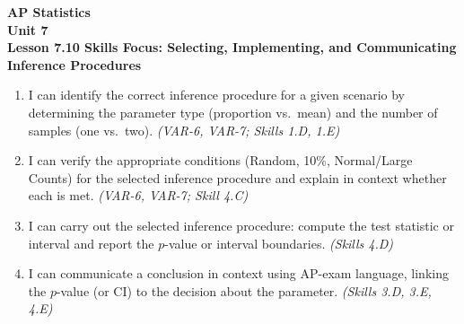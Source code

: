 \documentclass[10pt]{article}
\begin{document}
\vspace{-0.8in}

\begin{center}
  {\color{white}\textbf{\LARGE AP Statistics}}\\[4pt]
  {\color{skymid}\large\textbf{Unit 7}}\\[6pt]
  {\color{white}\textbf{\large Lesson 7.10 \quad Skills Focus: Selecting, Implementing, and Communicating Inference Procedures}}
\end{center}

\vspace{0.22in}
\namedateperiod
\vspace{0.18in}

\begin{learningtargetbox}
\small
\begin{enumerate}[leftmargin=1.5em, itemsep=5pt]
  \item I can identify the correct inference procedure for a given scenario by determining
        the parameter type (proportion vs.\ mean) and the number of samples (one vs.\ two).
        \textit{(VAR-6, VAR-7; Skills 1.D, 1.E)}
  \item I can verify the appropriate conditions (Random, 10\%, Normal/Large Counts) for the
        selected inference procedure and explain in context whether each is met.
        \textit{(VAR-6, VAR-7; Skill 4.C)}
  \item I can carry out the selected inference procedure: compute the test statistic or
        interval and report the $p$-value or interval boundaries.
        \textit{(Skills 4.D)}
  \item I can communicate a conclusion in context using AP-exam language, linking the
        $p$-value (or CI) to the decision about the parameter.
        \textit{(Skills 3.D, 3.E, 4.E)}
\end{enumerate}
\end{learningtargetbox}

\vspace{0.14in}
\end{document}
